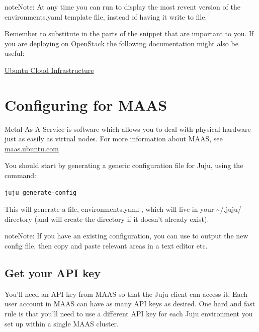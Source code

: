\documentclass[letterpaper,10pt,english]{sphinxmanual}
\begin{document}
\begin{notice}{note}{Note:}
At any time you can run  to display the most
revent version of the environments.yaml template file, instead of
having it write to file.
\end{notice}

Remember to substitute in the parts of the snippet that are important
to you. If you are deploying on OpenStack the following documentation
might also be useful:

\href{https://help.ubuntu.com/community/UbuntuCloudInfrastructure}{Ubuntu Cloud Infrastructure}


\chapter{Configuring for MAAS}
\label{config-maas::doc}\label{config-maas:configuring-for-maas}\label{config-maas:videos}
Metal As A Service is software which allows you to deal with physical
hardware just as easily as virtual nodes. For more information about
MAAS, see \href{http://maas.ubuntu.com}{maas.ubuntu.com}

You should start by generating a generic configuration file for Juju,
using the command:

\begin{Verbatim}[commandchars=\\\{\}]
juju generate-config
\end{Verbatim}

This will generate a file, environments.yaml , which will live in your
\textasciitilde{}/.juju/ directory (and will create the directory if it doesn't
already exist).

\begin{notice}{note}{Note:}
If you have an existing configuration, you can use  to output the new config file, then copy and
paste relevant areas in a text editor etc.
\end{notice}


\section{Get your API key}
\label{config-maas:get-your-api-key}
You'll need an API key from MAAS so that the Juju client can access
it. Each user account in MAAS can have as many API keys as desired.
One hard and fast rule is that you'll need to use a different API key
for each Juju environment you set up within a single MAAS cluster.
\end{document}
